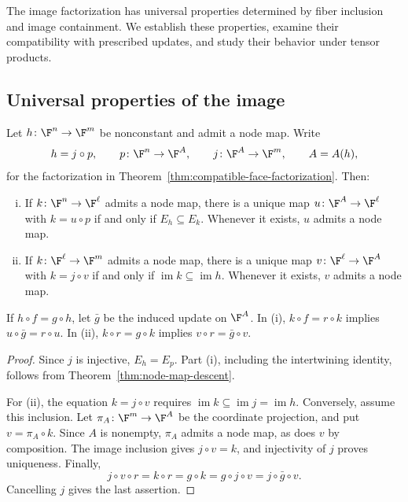 The image factorization has universal properties determined by fiber inclusion and image containment. We establish these properties, examine their compatibility with prescribed updates, and study their behavior under tensor products.

\subsection{Universal properties of the image}\label{subsec:image-universal-properties}

\begin{theorem}\label{thm:image-universal-properties}
Let $h\colon\F^n\to\F^m$ be nonconstant and admit a node map. Write
\[
    h=j\circ p,\qquad
    p\colon\F^n\to\F^A,\qquad j\colon\F^A\to\F^m,
    \qquad A=A(h),
\]
for the factorization in Theorem~\ref{thm:compatible-face-factorization}. Then:
\begin{enumerate}[(i)]
    \item If $k\colon\F^n\to\F^\ell$ admits a node map, there is a unique map $u\colon\F^A\to\F^\ell$ with $k=u\circ p$ if and only if $E_h\subseteq E_k$. Whenever it exists, $u$ admits a node map.
    \item If $k\colon\F^\ell\to\F^m$ admits a node map, there is a unique map $v\colon\F^\ell\to\F^A$ with $k=j\circ v$ if and only if $\operatorname{im}k\subseteq\operatorname{im}h$. Whenever it exists, $v$ admits a node map.
\end{enumerate}
If $h\circ f=g\circ h$, let $\bar g$ be the induced update on $\F^A$. In (i), $k\circ f=r\circ k$ implies $u\circ\bar g=r\circ u$. In (ii), $k\circ r=g\circ k$ implies $v\circ r=\bar g\circ v$.
\end{theorem}

\begin{proof}
Since $j$ is injective, $E_h=E_p$. Part (i), including the intertwining identity, follows from Theorem~\ref{thm:node-map-descent}.

For (ii), the equation $k=j\circ v$ requires $\operatorname{im}k\subseteq\operatorname{im}j=\operatorname{im}h$. Conversely, assume this inclusion. Let $\pi_A\colon\F^m\to\F^A$ be the coordinate projection, and put $v=\pi_A\circ k$. Since $A$ is nonempty, $\pi_A$ admits a node map, as does $v$ by composition. The image inclusion gives $j\circ v=k$, and injectivity of $j$ proves uniqueness. Finally,
\[
    j\circ v\circ r=k\circ r=g\circ k
    =g\circ j\circ v=j\circ\bar g\circ v.
\]
Cancelling $j$ gives the last assertion.
\end{proof}

